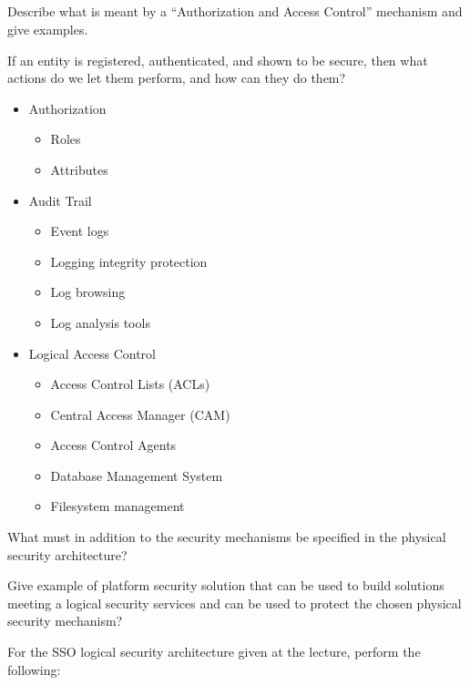 \begin{questions}
\begin{parts}
  \part{} Describe what is meant by a ``Authorization and Access Control'' mechanism and give examples.
    \begin{solution}
      If an entity is registered, authenticated, and shown to be secure, then what actions do we let them perform, and how can they do them?
      \begin{itemize}[noitemsep]
      \item Authorization
        \begin{itemize}[noitemsep]
        \item Roles
        \item Attributes
        \end{itemize}
      \item Audit Trail
        \begin{itemize}[noitemsep]
        \item Event logs
        \item Logging integrity protection
        \item Log browsing
        \item Log analysis tools
        \end{itemize}
      \item Logical Access Control
        \begin{itemize}[noitemsep]
        \item Access Control Lists (ACLs)
        \item Central Access Manager (CAM)
        \item Access Control Agents
        \item Database Management System
        \item Filesystem management
        \end{itemize}
      \end{itemize}
    \end{solution}

  \end{parts}

\item What must in addition to the security mechanisms be specified in the physical security architecture?
\item Give example of platform security solution that can be used to build solutions meeting a logical security services and can be used to protect the chosen physical security mechanism?
\item For the SSO logical security architecture given at the lecture, perform the following:
  \begin{parts}

\end{parts}
\end{questions}
